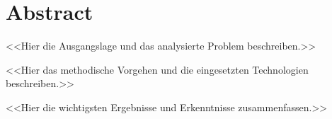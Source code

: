 
\chapter*{Abstract}

<<Hier die Ausgangslage und das analysierte Problem beschreiben.>>

<<Hier das methodische Vorgehen und die eingesetzten Technologien beschreiben.>>

<<Hier die wichtigsten Ergebnisse und Erkenntnisse zusammenfassen.>>
